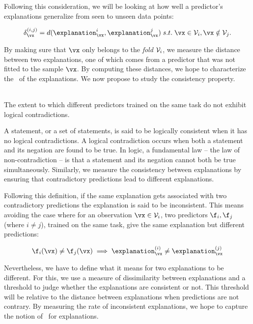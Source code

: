 Following this consideration, we will be looking at how well a predictor's explanations generalize from seen to unseen data points:

\begin{equation}
    \label{eq:mege:delta}
    \deltaij = d(\explanation_{\vx}^i, \explanation_{\vx}^j) \; s.t. \; \vx \in \fold_i, \vx \notin \fold_j.
\end{equation}

\noindent By making sure that $\vx$ only belongs to the \textit{fold} $\mathcal{V}_i$, we measure the distance between two explanations, one of which comes from a predictor that was not fitted to the sample $\vx$. 
By computing these distances, we hope to characterize the \representativity~of the explanations.
We now propose to study the consistency property.

\begin{definition}{\consistency} \\
The extent to which different predictors trained on the same task do not exhibit logical contradictions.
\label{def:mege:consistency}
\end{definition}

A statement, or a set of statements, is said to be logically consistent when it has no logical contradictions.
A logical contradiction occurs when both a statement and its negation are found to be true.
In logic, a fundamental law -- the law of non-contradiction -- is that a statement and its negation cannot both be true simultaneously.  
Similarly, we measure the consistency between explanations by ensuring that contradictory predictions lead to different explanations.

Following this definition, if the same explanation gets associated with two contradictory predictions the explanation is said to be inconsistent. 
This means avoiding the case where for an observation $\vx \in \fold_i$, two predictors $\f_i, \f_j$ (where $i \neq j$), trained on the same task, give the same explanation but different predictions:

\begin{align}
    \label{eq:mege:consistency}
    \f_i(\vx) \neq \f_j(\vx) \implies \explanation_{\vx}^{(i)} \neq \explanation_{\vx}^{(j)}
\end{align}

Nevertheless, we have to define what it means for two explanations to be different. For this, we use a measure of dissimilarity between explanations and a threshold to judge whether the explanations are consistent or not. This threshold will be relative to the distance between explanations when predictions are not contrary.
By measuring the rate of inconsistent explanations, we hope to capture the notion of \consistency~for explanations.

